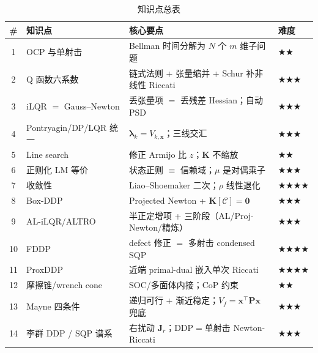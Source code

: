 \begin{table}[H]\centering\small
\caption{知识点总表}
\label{tab:ddp-summary}
\begin{tabular}{clll}
\toprule
\# & 知识点 & 核心要点 & 难度 \\
\midrule
1 & OCP 与单射击 & Bellman 时间分解为 $N$ 个 $m$ 维子问题 & $\bigstar\bigstar$ \\
2 & Q 函数六系数 & 链式法则 + 张量缩并 + Schur 补非线性 Riccati & $\bigstar\bigstar\bigstar$ \\
3 & iLQR $=$ Gauss--Newton & 丢张量项 $=$ 丢残差 Hessian；自动 PSD & $\bigstar\bigstar\bigstar$ \\
4 & Pontryagin/DP/LQR 统一 & $\boldsymbol{\lambda}_k=V_{k,\mathbf{x}}$；三线交汇 & $\bigstar\bigstar\bigstar$ \\
5 & Line search & 修正 Armijo 比 $z$；$\mathbf{K}$ 不缩放 & $\bigstar\bigstar$ \\
6 & 正则化 LM 等价 & 状态正则 $\equiv$ 信赖域；$\mu$ 是对偶乘子 & $\bigstar\bigstar\bigstar$ \\
7 & 收敛性 & Liao--Shoemaker 二次；$\rho$ 线性退化 & $\bigstar\bigstar\bigstar\bigstar$ \\
8 & Box-DDP & Projected Newton + $\mathbf{K}[\mathcal{C}]=\mathbf{0}$ & $\bigstar\bigstar\bigstar$ \\
9 & AL-iLQR/ALTRO & 半正定增项 + 三阶段（AL/Proj-Newton/精炼） & $\bigstar\bigstar\bigstar$ \\
10 & FDDP & defect 修正 $=$ 多射击 condensed SQP & $\bigstar\bigstar\bigstar\bigstar$ \\
11 & ProxDDP & 近端 primal-dual 嵌入单次 Riccati & $\bigstar\bigstar\bigstar\bigstar$ \\
12 & 摩擦锥/wrench cone & SOC/多面体内接；CoP 约束 & $\bigstar\bigstar$ \\
13 & Mayne 四条件 & 递归可行 + 渐近稳定；$V_f=\mathbf{x}^\top\mathbf{P}\mathbf{x}$ 兜底 & $\bigstar\bigstar\bigstar$ \\
14 & 李群 DDP / SQP 谱系 & 右扰动 $\mathbf{J}_r$；DDP$=$单射击 Newton-Riccati & $\bigstar\bigstar\bigstar$ \\
\bottomrule
\end{tabular}
\end{table}

